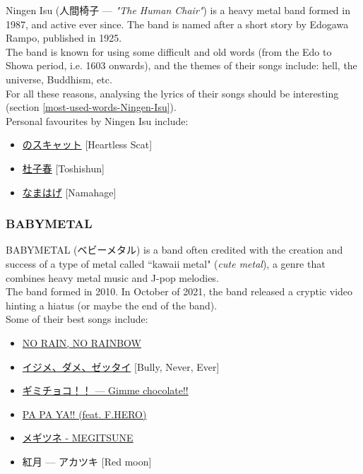 Ningen Isu (人間椅子 --- \emph{"The Human Chair"}) is a heavy metal band formed in 1987, and active ever since. The band is named after a short story by Edogawa Rampo, published in 1925. \\

The band is known for using some difficult and old words (from the Edo to Showa period, i.e. 1603 onwards), and the themes of their songs include: hell, the universe, Buddhism, etc. \\

For all these reasons, analysing the lyrics of their songs should be interesting (section \ref{most-used-words-Ningen-Isu}). \\

Personal favourites by Ningen Isu include:

\begin{itemize}
	\item \href{https://www.youtube.com/watch?v=CbI79e5iZKs}{のスキャット} [Heartless Scat]
	
	\item \href{https://www.youtube.com/watch?v=tKSjWKDSBmo}{杜子春} [Toshishun]
	
	\item \href{https://www.youtube.com/watch?v=CLoUY1kA4ZY}{なまはげ} [Namahage]
\end{itemize}

\bigskip

\subsubsection{BABYMETAL}

BABYMETAL (ベビーメタル) is a band often credited with the creation and success of a type of metal called ``kawaii metal" (\emph{cute metal}), a genre that combines heavy metal music and J-pop melodies. \\

The band formed in 2010. In October of 2021, the band released a cryptic video hinting a hiatus (or maybe the end of the band). \\

Some of their best songs include:

\begin{itemize}
	\item \href{https://www.youtube.com/watch?v=pDgqo6fcliY}{NO RAIN, NO RAINBOW}

	\item  \href{https://www.youtube.com/watch?v=nDqaTXqCN-Q}{イジメ、ダメ、ゼッタイ} [Bully, Never, Ever]
	
	\item \href{https://www.youtube.com/watch?v=WIKqgE4BwAY}{ギミチョコ！！ --- Gimme chocolate!!} 
		
	\item \href{https://www.youtube.com/watch?v=oO7Y8NsnkRg}{PA PA YA!! (feat. F.HERO)}
	
	\item \href{https://www.youtube.com/watch?v=cK3NMZAUKGw}{メギツネ - MEGITSUNE}
	
	\item 紅月 --- アカツキ [Red moon]
\end{itemize}

